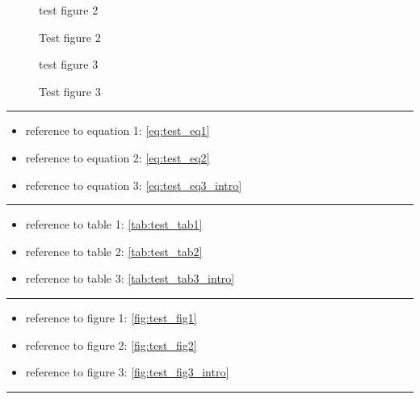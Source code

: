 \begin{figure}[h!]
	\centering
	test figure 2
	\caption{Test figure 2}
	\label{fig:test_fig2}
\end{figure}

\begin{figure}[h!]
	\centering
	test figure 3
	\caption{Test figure 3}
	\label{fig:test_fig3_intro}
\end{figure}

%
\hrule
\begin{itemize}
	\item reference to equation 1: \eqref{eq:test_eq1}
	\item reference to equation 2: \eqref{eq:test_eq2}
	\item reference to equation 3: \eqref{eq:test_eq3_intro}
\end{itemize}
\hrule
\begin{itemize}
	\item reference to table 1: \eqref{tab:test_tab1}
	\item reference to table 2: \eqref{tab:test_tab2}
	\item reference to table 3: \eqref{tab:test_tab3_intro}
\end{itemize}
\hrule
\begin{itemize}
	\item reference to figure 1: \eqref{fig:test_fig1}
	\item reference to figure 2: \eqref{fig:test_fig2}
	\item reference to figure 3: \eqref{fig:test_fig3_intro}
\end{itemize}
\hrule

%



%


%
